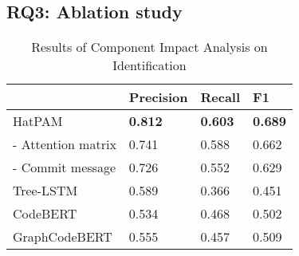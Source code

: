 \documentclass[acmsmall,screen,review,anonymous]{acmart} %
\begin{document}




\subsection{RQ3: Ablation study}

\begin{table}
  \centering
  \scriptsize
  \caption{Results of Component Impact Analysis on Identification}
  \renewcommand\arraystretch{1.31}
    \begin{tabular}{p{3cm}p{1.5cm}p{1.5cm}p{1cm}}
    \toprule
     &  \textbf{Precision} & \textbf{Recall} & \textbf{F1} \\
    \hline
    HatPAM & \textbf{0.812} & \textbf{0.603} & \textbf{0.689}\\
    - Attention matrix & 0.741 & 0.588 & 0.662 \\
    - Commit message  & 0.726 & 0.552 & 0.629 \\
    \hline
    Tree-LSTM & 0.589 & 0.366 & 0.451 \\ \hline
    CodeBERT & 0.534 & 0.468 & 0.502 \\ \hline
    GraphCodeBERT & 0.555 & 0.457 & 0.509 \\
    \hline
    \end{tabular}%
\end{table}%
\renewcommand\arraystretch{1.0}
\end{document}
